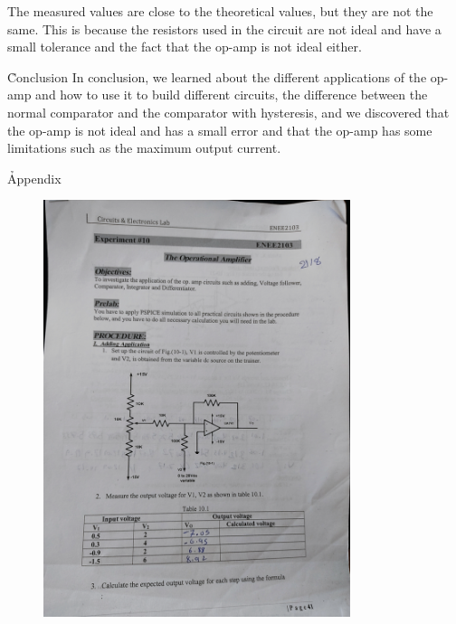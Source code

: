 \documentclass[12pt]{article}
\begin{document}
The measured values are close to the theoretical values, but they are not the same. This is because the resistors used in the circuit are not ideal and have a small tolerance and the fact that the op-amp is not ideal either.

\clearpage
\h{Conclusion}
In conclusion, we learned about the different applications of the op-amp and how to use it to build different circuits, the difference between the normal comparator and the comparator with hysteresis, and we discovered that the op-amp is not ideal and has a small error and that the op-amp has some limitations such as the maximum output current.
\clearpage


\clearpage
\h*{Appendix}
\begin{figure}[H]
    \centering
    \includegraphics[width=0.8\textwidth]{assets//main/2023-08-27-23-44-18.png}
\end{figure}
\clearpage
\end{document}
